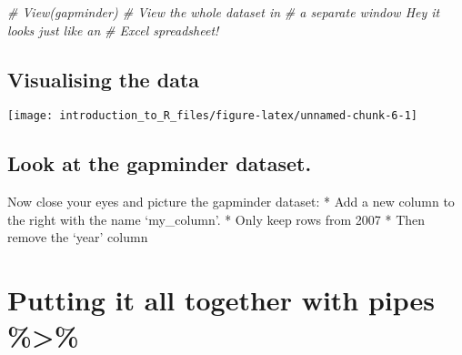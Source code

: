 \documentclass[]{tufte-handout}
\newenvironment{Shaded}{}{}
\newcommand{\CommentTok}[1]{\textcolor[rgb]{0.38,0.63,0.69}{\textit{#1}}}
\newcommand{\DataTypeTok}[1]{\textcolor[rgb]{0.56,0.13,0.00}{#1}}
\newcommand{\DecValTok}[1]{\textcolor[rgb]{0.25,0.63,0.44}{#1}}
\newcommand{\KeywordTok}[1]{\textcolor[rgb]{0.00,0.44,0.13}{\textbf{#1}}}
\newcommand{\NormalTok}[1]{#1}
\newcommand{\OperatorTok}[1]{\textcolor[rgb]{0.40,0.40,0.40}{#1}}
\newcommand{\StringTok}[1]{\textcolor[rgb]{0.25,0.44,0.63}{#1}}
\begin{document}
\begin{Shaded}
\begin{Highlighting}[]
\CommentTok{# View(gapminder) # View the whole dataset in}
\CommentTok{# a separate window Hey it looks just like an}
\CommentTok{# Excel spreadsheet!}
\end{Highlighting}
\end{Shaded}

\hypertarget{visualising-the-data}{%
\subsection{Visualising the data}\label{visualising-the-data}}

\begin{Shaded}
\end{Shaded}

\texttt{[image: introduction\_to\_R\_files/figure-latex/unnamed-chunk-6-1]}

\hypertarget{look-at-the-gapminder-dataset.}{%
\subsection{Look at the gapminder
dataset.}\label{look-at-the-gapminder-dataset.}}

Now close your eyes and picture the gapminder dataset: * Add a new
column to the right with the name `my\_column'. * Only keep rows from
2007 * Then remove the `year' column

\hypertarget{putting-it-all-together-with-pipes}{%
\section{Putting it all together with pipes
\%\textgreater{}\%}\label{putting-it-all-together-with-pipes}}

\begin{Shaded}
\end{Shaded}
\end{document}
